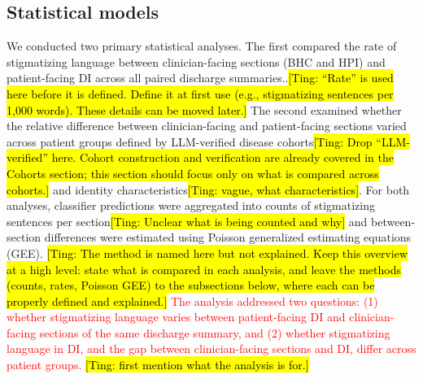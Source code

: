 \documentclass[unnumsec,webpdf,contemporary,large]{oup-authoring-template}
\newcommand{\td}[1]{\sethlcolor{pink}\hl{[Ting: #1]}}
\begin{document}
\subsection{Statistical models}

We conducted two primary statistical analyses. The first compared the rate of stigmatizing language between clinician-facing sections (BHC and HPI) and patient-facing DI across all paired discharge summaries..\td{``Rate'' is used here before it is defined. Define it at first use (e.g., stigmatizing sentences per 1,000 words). These details can be moved later.} The second examined whether the relative difference between clinician-facing and patient-facing sections varied across patient groups defined by LLM-verified disease cohorts\td{Drop ``LLM-verified'' here. Cohort construction and verification are already covered in the Cohorts section; this section should focus only on what is compared across cohorts.} and identity characteristics\td{vague, what characteristics}. For both analyses, classifier predictions were aggregated into counts of stigmatizing sentences per section\td{Unclear what is being counted and why} and between-section differences were estimated using Poisson generalized estimating equations (GEE).\cite{zeger1986} \td{The method is named here but not explained. Keep this overview at a high level: state what is compared in each analysis, and leave the methods (counts, rates, Poisson GEE) to the subsections below, where each can be properly defined and explained.}
\textcolor{red}{
The analysis addressed two questions: (1) whether stigmatizing language varies between patient-facing DI and clinician-facing sections of the same discharge summary, and (2) whether stigmatizing language in DI, and the gap between clinician-facing sections and DI, differ across patient groups.} \td{first mention what the analysis is for.}
\end{document}
